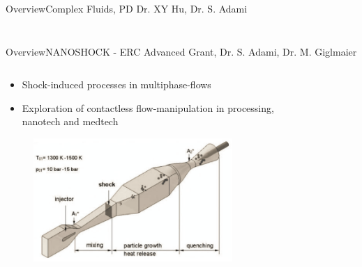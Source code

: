 \documentclass[AERbeamer%
              ,optEnglish%
              ,optBiber%
              ,optBibstyleAlphabetic%
              ,optBeamerClassicFormat%
              ]{AERlatex}%
\begin{document}
\begin{frame}[c]{Overview}{Complex Fluids, PD Dr. XY Hu, Dr. S. Adami}
\begin{columns}[T]
\begin{column}{0.48\textwidth}
\begin{figure}
            \end{figure}
        \end{column}
    \end{columns}
\end{frame}


\begin{frame}[c]{Overview}{NANOSHOCK - ERC Advanced Grant, Dr. S. Adami, Dr. M. Giglmaier}
    \centering
    \begin{columns}[T]
        \begin{column}{0.48\textwidth}
            \centering
            \begin{itemize}
                \item Shock-induced processes in multiphase-flows
                \item Exploration of contactless flow-manipulation in processing, nanotech and medtech
            \end{itemize}
            \begin{figure}
                \centering
                \includegraphics[width=0.8\textwidth]{Nanoshock1.png}
            \end{figure}
        \end{column}
        \begin{column}{0.48\textwidth}
            \centering
            \begin{figure}
                \centering

\end{figure}
\end{column}
\end{columns}
\end{frame}
\end{document}
